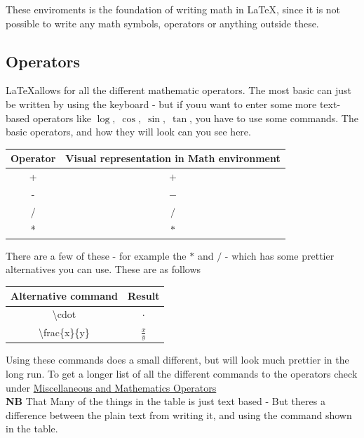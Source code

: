 \documentclass{article}
\newcommand{\bs}[1]{\textbackslash{}#1} %
\begin{document}
These enviroments is the foundation of writing math in \LaTeX, since it is not possible to write any math symbols, operators or anything outside these.

\subsection{Operators}
\LaTeX allows for all the different mathematic operators. The most basic can just be written by using the keyboard - but if youu want to enter some more text-based operators like $\log, \; \cos, \; \sin, \; \tan$, you have to use some commands. The basic operators, and how they will look can you see here.

\begin{table}[h]
   \centering
   \begin{tabular}{|c|c|} \hline
    \rowcolor{gray!30}
    Operator & Visual representation in Math environment \\ \hline
    + & $+$ \\ \hline
    - & $-$ \\ \hline
    / & $/$ \\ \hline
    * & $*$ \\ \hline
   \end{tabular} 
\end{table}

There are a few of these - for example the $*$ and $/$ - which has some prettier alternatives you can use. These are as follows

\begin{table}[h]
    \centering
    \begin{tabular}{|c|c|} \hline
        \rowcolor{gray!30}
        Alternative command & Result \\ \hline
        \bs{cdot} & $\cdot$ \\ \hline
        \bs{frac\{x\}\{y\}} & $\frac{x}{y}$ \\ \hline
    \end{tabular}
\end{table}

Using these commands does a small different, but will look much prettier in the long run. To get a longer list of all the different commands to the operators check under \hyperref[secc:Math-Operators]{Miscellaneous and Mathematics Operators} \\
\textbf{NB} That Many of the things in the table is just text based - But theres a difference between the plain text from writing it, and using the command shown in the table.
\end{document}
